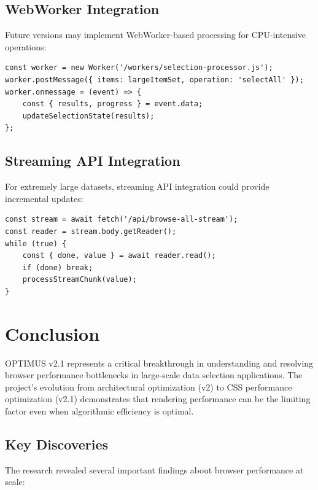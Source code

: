 \documentclass[10pt]{article}
\begin{document}
\subsection{WebWorker Integration}

Future versions may implement WebWorker-based processing for CPU-intensive operations:

\begin{lstlisting}[caption={WebWorker Processing Concept}]
const worker = new Worker('/workers/selection-processor.js');
worker.postMessage({ items: largeItemSet, operation: 'selectAll' });
worker.onmessage = (event) => {
    const { results, progress } = event.data;
    updateSelectionState(results);
};
\end{lstlisting}

\subsection{Streaming API Integration}

For extremely large datasets, streaming API integration could provide incremental updates:

\begin{lstlisting}[caption={Streaming Selection Concept}]
const stream = await fetch('/api/browse-all-stream');
const reader = stream.body.getReader();
while (true) {
    const { done, value } = await reader.read();
    if (done) break;
    processStreamChunk(value);
}
\end{lstlisting}

\section{Conclusion}

OPTIMUS v2.1 represents a critical breakthrough in understanding and resolving browser performance bottlenecks in large-scale data selection applications. The project's evolution from architectural optimization (v2) to CSS performance optimization (v2.1) demonstrates that rendering performance can be the limiting factor even when algorithmic efficiency is optimal.

\subsection{Key Discoveries}

The research revealed several important findings about browser performance at scale:
\end{document}
